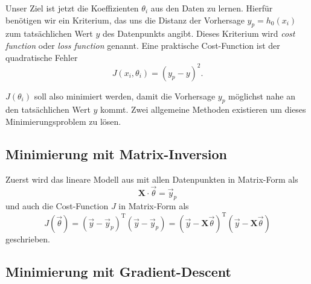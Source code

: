 Unser Ziel ist jetzt die Koeffizienten $\theta_i$ aus den Daten zu lernen. Hierfür
benötigen wir ein Kriterium, das uns die Distanz der Vorhersage $y_p = h_0(x_i)$ zum tatsächlichen
Wert $y$ des Datenpunkts angibt. Dieses Kriterium wird \emph{cost function} oder
\emph{loss function} genannt. Eine praktische Cost-Function ist der quadratische Fehler
\begin{equation}
J(x_i, \theta_i) = (y_p - y)^2.
\end{equation}

$J(\theta_i)$ soll also minimiert werden, damit die Vorhersage $y_p$ möglichst nahe an den
tatsächlichen Wert $y$ kommt. Zwei allgemeine Methoden existieren um dieses
Minimierungsproblem zu lösen.

\subsection{Minimierung mit Matrix-Inversion}

Zuerst wird das lineare Modell aus  mit allen Datenpunkten
in Matrix-Form als
\begin{equation}
\mathbf{X} \cdot \vec \theta = \vec y_p
\end{equation}
und auch die Cost-Function $J$ in Matrix-Form als
\begin{equation}
J(\vec \theta) =\left(\vec y - \vec y_p\right)^\mathrm{T} \left(\vec y - \vec y_p\right)
= \left(\vec y - \mathbf{X} \vec \theta\right)^\mathrm{T} \left(\vec y - \mathbf{X} \vec \theta\right)
\end{equation}
geschrieben.


\subsection{Minimierung mit Gradient-Descent}